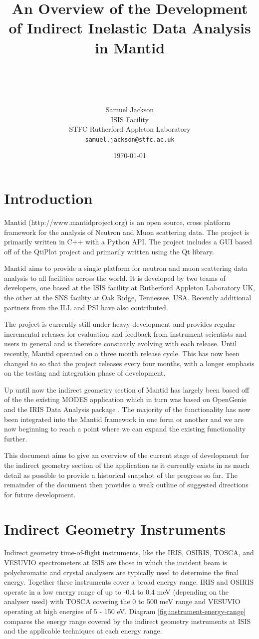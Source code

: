 \documentclass[paper=a4, fontsize=11pt]{scrartcl}	%
\title{ \vspace{-1in} 	\usefont{OT1}{bch}{b}{n}
		\huge \strut An Overview of the Development of Indirect Inelastic Data Analysis in Mantid\strut \\
}
\author{ 									\usefont{OT1}{bch}{m}{n}
        Samuel Jackson\\		\usefont{OT1}{bch}{m}{n}
		ISIS Facility\\	\usefont{OT1}{bch}{m}{n}
        STFC Rutherford Appleton Laboratory\\
        \texttt{samuel.jackson@stfc.ac.uk}
}
\date{\today}
\numberwithin{equation}{section}															%
\numberwithin{figure}{section}																%
\numberwithin{table}{section}																%
\begin{document}
\maketitle
\clearpage
\tableofcontents
\section{Introduction}
Mantid (http://www.mantidproject.org) is an open source, cross platform framework for the analysis of Neutron and Muon scattering data. The project is primarily written in C++ with a Python API. The project includes a GUI based off of the QtiPlot project and primarily written using the Qt library.

Mantid aims to provide a single platform for neutron and muon scattering data analysis to all facilities across the world. It is developed by two teams of developers, one based at the ISIS facility at Rutherford Appleton Laboratory UK, the other at the SNS facility at Oak Ridge, Tennessee, USA. Recently additional partners from the ILL and PSI have also contributed.

The project is currently still under heavy development and provides regular incremental releases for evaluation and feedback from instrument scientists and users in general and is therefore constantly evolving with each release. Until recently, Mantid operated on a three month release cycle. This has now been changed to so that the project releases every four months, with a longer emphasis on the testing and integration phase of development.

Up until now the indirect geometry section of Mantid has largely been based off of the the existing MODES application which in turn was based on OpenGenie \cite{wshowells2010} and the IRIS Data Analysis package \cite{wshowells1996}. The majority of the functionality has now been integrated into the Mantid framework in one form or another and we are now beginning to reach a point where we can expand the existing functionality further.

This document aims to give an overview of the current stage of development for the indirect geometry section of the application as it currently exists in as much detail as possible to provide a historical snapshot of the progress so far. The remainder of the document then provides a weak outline of suggested directions for future development.

\section{Indirect Geometry Instruments}
Indirect geometry time-of-flight instruments, like the IRIS, OSIRIS, TOSCA, and VESUVIO spectrometers at ISIS are those in which the incident beam is polychromatic and crystal analysers are typically used to determine the final energy. Together these instruments cover a broad energy range. IRIS and OSIRIS operate in a low energy range of up to -0.4 to 0.4 meV (depending on the analyser used) with TOSCA covering the 0 to 500 meV range and VESUVIO operating at high energies of 5 - 150 eV. Diagram \ref{fig:instrument-energy-range} compares the energy range covered by the indirect geometry instruments at ISIS and the applicable techniques at each energy range.
\end{document}
